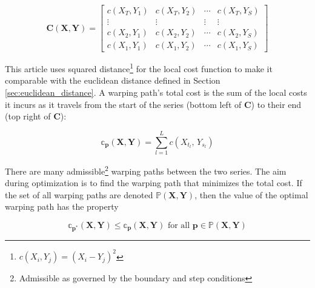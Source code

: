 \documentclass[12pt]{report}
\begin{document}
\begin{equation}
    \mathbf{C}(\boldsymbol{X}, \boldsymbol{Y}) = \left[ 
        \begin{array}{cccc}
            c(X_{T}, Y_{1}) & c(X_{T}, Y_{2}) & \cdots & c(X_{T}, Y_{S}) \\ 
            \vdots          & \vdots          & \vdots & \vdots          \\
            c(X_{2}, Y_{1}) & c(X_{2}, Y_{2}) & \cdots & c(X_{2}, Y_{S}) \\ 
            c(X_{1}, Y_{1}) & c(X_{1}, Y_{2}) & \cdots & c(X_{1}, Y_{S})
    \end{array}\right]
\end{equation}

This article uses squared distance\footnote{$c(X_{i}, Y_{j}) = (X_{i} - Y_{j})^2$} for the local cost function to make it comparable with the euclidean distance defined in Section \ref{sec:euclidean_distance}. A warping path's total cost is the sum of the local costs it incurs as it travels from the start of the series (bottom left of $\boldsymbol{C}$) to their end (top right of $\boldsymbol{C}$):

\begin{equation} \label{eq:dtw_cost_matrix_definition}
    \mathbb{c}_{\boldsymbol{p}}(\boldsymbol{X}, \boldsymbol{Y}) = \sum^{L}_{l=1} c(X_{t_{l}},\, Y_{s_{l}})
\end{equation}

There are many admissible\footnote{Admissible as governed by the boundary and step conditions} warping paths between the two series. The aim during optimization is to find the warping path that minimizes the total cost. If the set of all warping paths are denoted $\mathbb{P}(\boldsymbol{X}, \boldsymbol{Y})$, then the value of the optimal warping path has the property

\begin{equation}
    \mathbb{c}_{\boldsymbol{p}^{*}}(\boldsymbol{X}, \boldsymbol{Y}) \le \mathbb{c}_{\boldsymbol{p}}(\boldsymbol{X}, \boldsymbol{Y}) \,\, \textrm{for all} \,\, \boldsymbol{p} \in \mathbb{P}(\boldsymbol{X}, \boldsymbol{Y})
\end{equation}
\end{document}
